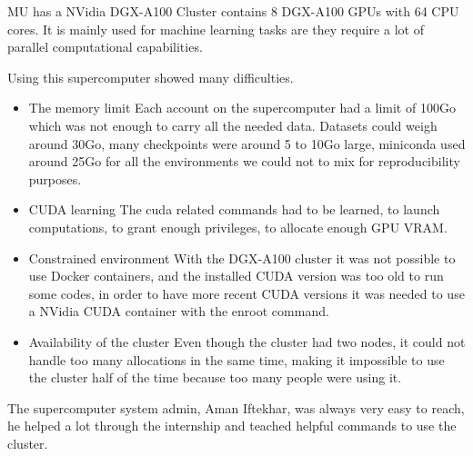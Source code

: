 MU has a NVidia DGX-A100 Cluster contains 8 DGX-A100 GPUs with 64 CPU cores. It
is mainly used for machine learning tasks are they require a lot of parallel
computational capabilities.

Using this supercomputer showed many difficulties.
\begin{itemize}
\item The memory limit
Each account on the supercomputer had a limit of 100Go which was not enough to
carry all the needed data. Datasets could weigh around 30Go, many checkpoints
were around 5 to 10Go large, miniconda used around 25Go for all the
environments we could not to mix for reproducibility purposes.

\item CUDA learning
The cuda related commands had to be learned, to launch computations, to grant
enough privileges, to allocate enough GPU VRAM.

\item Constrained environment
With the DGX-A100 cluster it was not possible to use Docker containers, and the
installed CUDA version was too old to run some codes, in order to have more
recent CUDA versions it was needed to use a NVidia CUDA container with the
enroot command.

\item Availability of the cluster
Even though the cluster had two nodes, it could not handle too many allocations
in the same time, making it impossible to use the cluster half of the time
because too many people were using it. 
\end{itemize}

The supercomputer system admin, Aman Iftekhar, was always very easy to reach, he
helped a lot through the internship and teached helpful commands to use the
cluster.